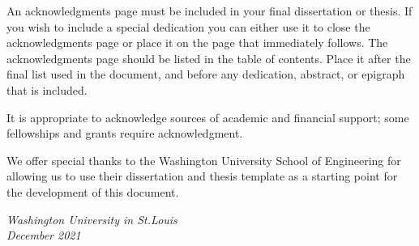 \thesisacknowledgments

An acknowledgments page must be included in your final dissertation or thesis.  If you wish to
include a special dedication you can either use it to close the acknowledgments page or place it on
the page that immediately follows.  The acknowledgments page should be listed in the table of
contents.  Place it after the final list used in the document, and before any dedication, abstract,
or epigraph that is included.

It is appropriate to acknowledge sources of academic and financial support; some fellowships and
grants require acknowledgment.

We offer special thanks to the Washington University School of Engineering for allowing us to use
their dissertation and thesis template as a starting point for the development of this document.

\null\hfill \thesisauthor

\noindent
\textit{Washington University in St.\@ Louis}\\
\textit{December 2021}

